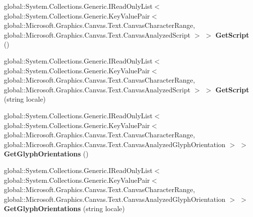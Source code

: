 \begin{DoxyCompactItemize}
\item 
\mbox{\label{interface_microsoft_1_1_graphics_1_1_canvas_1_1_text_1_1_i_canvas_text_analyzer_af6e77ce224393b7d9086c00518fe11ff}} 
global\+::\+System.\+Collections.\+Generic.\+I\+Read\+Only\+List$<$ global\+::\+System.\+Collections.\+Generic.\+Key\+Value\+Pair$<$ global\+::\+Microsoft.\+Graphics.\+Canvas.\+Text.\+Canvas\+Character\+Range, global\+::\+Microsoft.\+Graphics.\+Canvas.\+Text.\+Canvas\+Analyzed\+Script $>$ $>$ {\bfseries Get\+Script} ()
\item 
\mbox{\label{interface_microsoft_1_1_graphics_1_1_canvas_1_1_text_1_1_i_canvas_text_analyzer_a49d7a00ef1aba0f0791869b786ee7738}} 
global\+::\+System.\+Collections.\+Generic.\+I\+Read\+Only\+List$<$ global\+::\+System.\+Collections.\+Generic.\+Key\+Value\+Pair$<$ global\+::\+Microsoft.\+Graphics.\+Canvas.\+Text.\+Canvas\+Character\+Range, global\+::\+Microsoft.\+Graphics.\+Canvas.\+Text.\+Canvas\+Analyzed\+Script $>$ $>$ {\bfseries Get\+Script} (string locale)
\item 
\mbox{\label{interface_microsoft_1_1_graphics_1_1_canvas_1_1_text_1_1_i_canvas_text_analyzer_a79f1fde65a69de1c7ae6d2697ced5aea}} 
global\+::\+System.\+Collections.\+Generic.\+I\+Read\+Only\+List$<$ global\+::\+System.\+Collections.\+Generic.\+Key\+Value\+Pair$<$ global\+::\+Microsoft.\+Graphics.\+Canvas.\+Text.\+Canvas\+Character\+Range, global\+::\+Microsoft.\+Graphics.\+Canvas.\+Text.\+Canvas\+Analyzed\+Glyph\+Orientation $>$ $>$ {\bfseries Get\+Glyph\+Orientations} ()
\item 
\mbox{\label{interface_microsoft_1_1_graphics_1_1_canvas_1_1_text_1_1_i_canvas_text_analyzer_a47f54cf6a9c8b69d01323558348e4570}} 
global\+::\+System.\+Collections.\+Generic.\+I\+Read\+Only\+List$<$ global\+::\+System.\+Collections.\+Generic.\+Key\+Value\+Pair$<$ global\+::\+Microsoft.\+Graphics.\+Canvas.\+Text.\+Canvas\+Character\+Range, global\+::\+Microsoft.\+Graphics.\+Canvas.\+Text.\+Canvas\+Analyzed\+Glyph\+Orientation $>$ $>$ {\bfseries Get\+Glyph\+Orientations} (string locale)
\item 

\end{DoxyCompactItemize}
